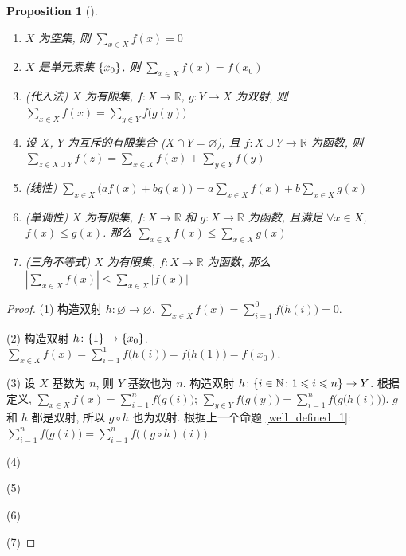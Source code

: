 \documentclass[UTF8]{ctexart}
\theoremstyle{mystyle}
\newtheorem{proposition}{Proposition}[section]
\theoremstyle{myremark}
\theoremstyle{plain}
\newcommand{\R}{\mathbb R}
\newcommand{\N}{\mathbb N}
\DeclarePairedDelimiter\set{\{}{\}}
\begin{document}
\begin{proposition}[] \label{summation} \ 
    \begin{enumerate}
        \item $ X $ 为空集, 则 $ \displaystyle \sum_{x \in X} f(x) = 0 $
        \item $ X $ 是单元素集 $ \set{x_0} $, 则 $ \displaystyle \sum_{x \in X} f(x) = f(x_0) $
        \item (代入法) $ X $ 为有限集, $ f \colon X \to \R $, $ g \colon Y \to X $ 为双射, 则 $ \displaystyle \sum_{x \in X} f(x) = \sum_{y \in Y} f \big( g(y) \big) $
        \item 设 $ X $, $ Y $ 为互斥的有限集合 ($ X \cap Y = \varnothing $), 且 $ f \colon X \cup Y \to \R $ 为函数, 则 $ \displaystyle \sum_{z \in X \cup Y} f(z) = \sum_{x \in X} f(x) + \sum_{y \in Y} f(y) $
        \item (线性) $ \displaystyle \sum_{x \in X} \big(a f(x) + b g(x)\big) = a \sum_{x \in X} f(x) + b \sum_{x \in X} g(x) $
        \item (单调性) $ X $ 为有限集, $ f \colon X \to \R $ 和 $ g \colon X \to \R $ 为函数, 且满足 $ \forall x \in X $, $ f(x) \leqslant g(x) $. 那么 $ \displaystyle \sum_{x \in X} f(x) \leqslant \sum_{x \in X} g(x) $
        \item (三角不等式) $ X $ 为有限集, $ f \colon X \to \R $ 为函数, 那么 $ \displaystyle \left| \sum_{x \in X} f(x) \right| \leqslant \sum_{x \in X} |f(x)| $
    \end{enumerate}
\end{proposition}

\begin{proof}
    (1) 构造双射 $ h \colon \varnothing \to \varnothing $. $ \displaystyle \sum_{x \in X} f(x) = \sum_{i = 1}^{0} f \big( h(i) \big) = 0 $.

    (2) 构造双射 $ h \colon \set{1} \to \set{x_0} $. $ \displaystyle \sum_{x \in X} f(x) = \sum_{i = 1}^{1} f \big( h(i) \big) = f \big( h(1) \big) = f(x_0) $.

    (3) 设 $ X $ 基数为 $ n $, 则 $ Y $ 基数也为 $ n $. 构造双射 $ h \colon \set{i \in \N \colon 1 \leqslant i \leqslant n} \to Y $. 根据定义, $ \displaystyle \sum_{x \in X} f(x) = \sum_{i = 1}^{n} f \big( g(i) \big) $; $ \displaystyle \sum_{y \in Y} f \big( g(y) \big) = \sum_{i = 1}^{n} f \Big( g \big( h (i) \big) \Big) $. $ g $ 和 $ h $ 都是双射, 所以 $ g \circ h $ 也为双射. 根据上一个命题 \ref{well_defined_1}: $ \displaystyle \sum_{i = 1}^{n} f \big( g(i) \big) = \sum_{i = 1}^{n} f \big( (g \circ h)(i) \big) $.

    (4)

    (5)

    (6)

    (7)
\end{proof}
\end{document}
